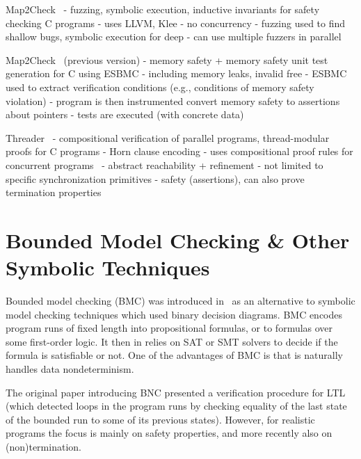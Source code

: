 Map2Check~
- fuzzing, symbolic execution, inductive invariants for safety checking C programs
- uses LLVM, Klee
- no concurrency
- fuzzing used to find shallow bugs, symbolic execution for deep
- can use multiple fuzzers in parallel

Map2Check~ (previous version)
- memory safety + memory safety unit test generation for C using ESBMC
  - including memory leaks, invalid free
- ESBMC used to extract verification conditions (e.g., conditions of memory safety violation)
- program is then instrumented convert memory safety to assertions about pointers
- tests are executed (with concrete data)

Threader~
- compositional verification of parallel programs, thread-modular proofs for C programs
- Horn clause encoding
- uses compositional proof rules for concurrent programs~
- abstract reachability + refinement
- not limited to specific synchronization primitives
- safety (assertions), can also prove termination properties



\section{Bounded Model Checking \& Other Symbolic Techniques}

Bounded model checking (BMC) was introduced in~\cite{Biere1999} as an alternative to
symbolic model checking techniques which used binary decision diagrams.
BMC encodes program runs of fixed length into propositional formulas, or to
formulas over some first-order logic.
It then in relies on SAT or SMT solvers to decide if the formula is satisfiable
or not. 
One of the advantages of BMC is that is naturally handles data nondeterminism.

The original paper introducing BNC presented a verification procedure for LTL
(which detected loops in the program runs by checking equality of the last
state of the bounded run to some of its previous states).
However, for realistic programs the focus is mainly on safety properties, and
more recently also on (non)termination.

